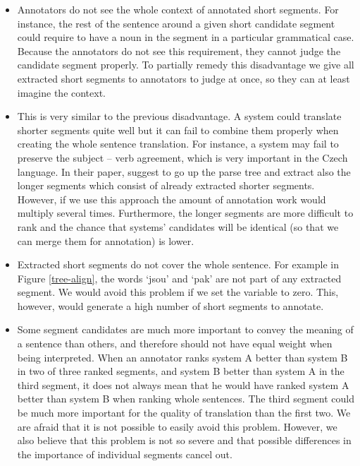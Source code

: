 \begin{itemize}

  \item Annotators do not see the whole context of annotated short segments.
    For instance, the rest of the sentence around a given short candidate segment
    could require to have a noun in the segment in a particular grammatical
    case. Because the annotators do not see this requirement, they cannot judge the
    candidate segment properly.  To partially remedy this disadvantage we
    give all extracted short segments to annotators to judge at once, so they
    can at least imagine the context.

  \item This is very similar to the previous disadvantage. A system could
    translate shorter segments quite well but it can fail to combine them
    properly when creating the whole sentence translation. For instance, a
    system may fail to preserve the subject -- verb agreement, which is very
    important in the Czech language.  In their paper,
     suggest to go up the parse tree and extract
    also the longer segments which consist of already extracted shorter
    segments. However, if we use this approach the amount of annotation work
    would multiply several times. Furthermore, the longer segments are more
    difficult to rank and the chance that systems' candidates will be identical
    (so that we can merge them for annotation) is lower.

  \item Extracted short segments do not cover the whole sentence. For example
    in Figure \ref{tree-align}, the words `jsou' and `pak' are not part of any
    extracted segment. We would avoid this problem if we set the variable
     to zero. This, however, would generate a high number of short
    segments to annotate.

  \item Some segment candidates are much more important to convey the meaning
    of a sentence than others, and therefore should not have equal weight when
    being interpreted. When an annotator ranks system A better than system B in
    two of three ranked segments, and system B better than system A in the
    third segment, it does not always mean that he would have ranked system A
    better than system B when ranking whole sentences. The third segment could
    be much more important for the quality of translation than the first two.
    We are afraid that it is not possible to easily avoid this problem.
    However, we also believe that this problem is not so severe and that
    possible differences in the importance of individual segments cancel out.

\end{itemize}

